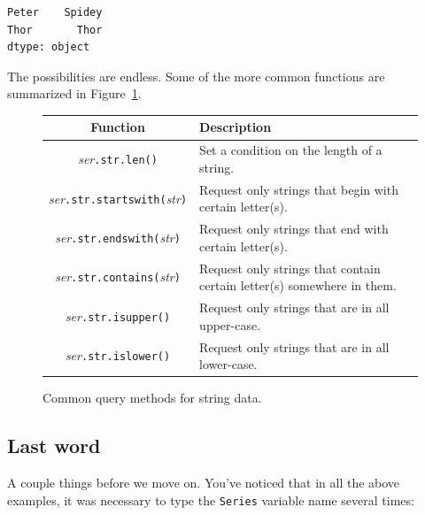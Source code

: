 \begin{Verbatim}[fontsize=\small,samepage=true,frame=leftline,framesep=5mm,framerule=1mm]
Peter    Spidey
Thor       Thor
dtype: object
\end{Verbatim}

The possibilities are endless. Some of the more common functions are summarized
in Figure~\ref{fig:stringQueryFunctions}.

\setlength\extrarowheight{5pt}

\begin{figure}[ht]
\centering
\footnotesize
\begingroup
\par\tagpdfparaOff
{}
\begin{tabular}{c|p{2.8in}}
Function & Description \\
\hline

\textsl{ser}\texttt{.str.len()} & Set a condition on the length of a string. \\

\textsl{ser}\texttt{.str.startswith(}\textsl{str}\texttt{)} & Request only
strings that begin with certain letter(s). \\

\textsl{ser}\texttt{.str.endswith(}\textsl{str}\texttt{)} & Request only
strings that end with certain letter(s). \\

\textsl{ser}\texttt{.str.contains(}\textsl{str}\texttt{)} & Request only
strings that contain certain letter(s) somewhere in them. \\

\textsl{ser}\texttt{.str.isupper()} & Request only strings that are in all
upper-case. \\

\textsl{ser}\texttt{.str.islower()} & Request only strings that are in all
lower-case. \\

\end{tabular}\par
\endgroup
\bigskip
\caption{Common query methods for string data.}
\label{fig:stringQueryFunctions}
\end{figure}

\subsection{Last word}

A couple things before we move on. You've noticed that in all the above
examples, it was necessary to type the \texttt{Series} variable name several
times:

